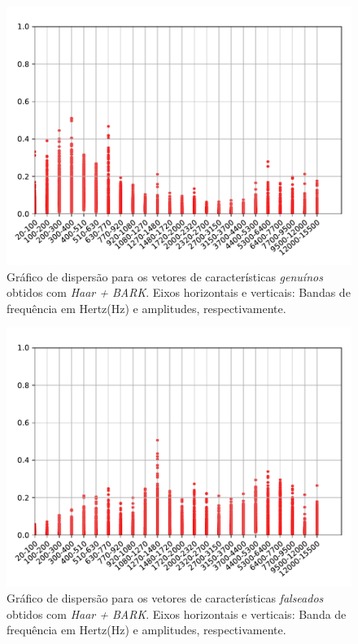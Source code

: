 \begin{figure}[H]
	\centering
	\includegraphics[scale=.8]{./images/results/barkVersusMel/Genuine_haar_Bark.pdf}
	\caption{Gráfico de dispersão para os vetores de características \textit{genuínos} obtidos com \textit{Haar + BARK}. Eixos horizontais e verticais: Bandas de frequência em Hertz(Hz) e amplitudes, respectivamente.}
	\label{fig:livehaarbark}
\end{figure}
\begin{figure}[H]
	\centering
	\includegraphics[scale=.8]{./images/results/barkVersusMel/Spoofing_haar_Bark.pdf}
	\caption{Gráfico de dispersão para os vetores de características \textit{falseados} obtidos com \textit{Haar + BARK}. Eixos horizontais e verticais: Banda de frequência em Hertz(Hz) e amplitudes, respectivamente.}
	\label{fig:spoofinghaarbark}
\end{figure}
